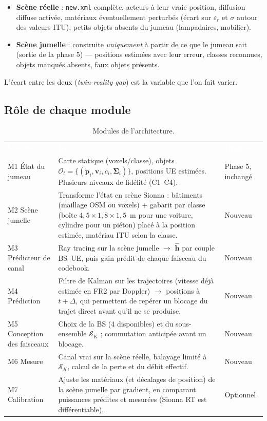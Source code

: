 \documentclass[11pt,a4paper]{article}
\newcommand{\hd}[1]{\textcolor{white}{\textbf{#1}}}
\begin{document}
\begin{itemize}
  \item \textbf{Scène réelle} : \texttt{new.xml} complète, acteurs à leur vraie position, diffusion
        diffuse activée, matériaux éventuellement perturbés (écart sur $\varepsilon_r$ et
        $\sigma$ autour des valeurs ITU), petits objets absents du jumeau (lampadaires, mobilier).
  \item \textbf{Scène jumelle} : construite \emph{uniquement} à partir de ce que le jumeau sait
        (sortie de la phase 5) --- positions estimées avec leur erreur, classes reconnues,
        objets manqués absents, faux objets présents.
\end{itemize}
L'écart entre les deux (\textit{twin-reality gap}) est la variable que l'on fait varier.

\subsection{Rôle de chaque module}

\begin{table}[H]
\centering
\caption{Modules de l'architecture.}
\label{tab:modules}
\begin{tabularx}{\linewidth}{B{2.6cm} L P{2.2cm}}
\hd{Module} & \hd{Rôle} & \hd{Origine} \\
M1 État du jumeau & Carte statique (voxels/classe), objets $\mathcal{O}_t=\{(\mathbf{p}_i,\mathbf{v}_i,c_i,\boldsymbol{\Sigma}_i)\}$, positions UE estimées. Plusieurs niveaux de fidélité (C1--C4). & Phase 5, inchangé \\
M2 Scène jumelle & Transforme l'état en scène Sionna : bâtiments (maillage OSM ou voxels) + gabarit par classe (boîte $4{,}5\times1{,}8\times1{,}5$~m pour une voiture, cylindre pour un piéton) placé à la position estimée, matériau ITU selon la classe. & Nouveau \\
M3 Prédicteur de canal & Ray tracing sur la scène jumelle $\to$ $\hat{\mathbf{h}}$ par couple BS--UE, puis gain prédit de chaque faisceau du codebook. & Nouveau \\
M4 Prédiction & Filtre de Kalman sur les trajectoires (vitesse déjà estimée en FR2 par Doppler) $\to$ positions à $t+\Delta$, qui permettent de repérer un blocage du trajet direct avant qu'il ne se produise. & Nouveau \\
M5 Conception des faisceaux & Choix de la BS (4 disponibles) et du sous-ensemble $\mathcal{S}_K$ ; commutation anticipée avant un blocage. & Nouveau \\
M6 Mesure & Canal vrai sur la scène réelle, balayage limité à $\mathcal{S}_K$, calcul de la perte et du débit effectif. & Nouveau \\
M7 Calibration & Ajuste les matériaux (et décalages de position) de la scène jumelle par gradient, en comparant puissances prédites et mesurées (Sionna RT est différentiable). & Optionnel \\
\end{tabularx}
\end{table}
\end{document}
